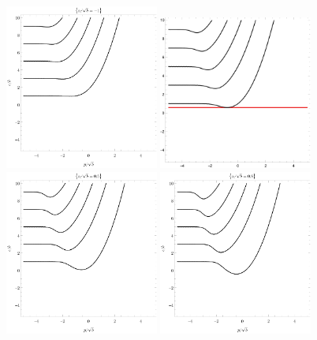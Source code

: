 \begin{figure}[p]
    \centering
    \noindent
    \includegraphics[width=0.45\textwidth]{grafy/robin-1.pdf}%
    \hspace{0.1\textwidth}%
    \includegraphics[width=0.45\textwidth]{grafy/robin0-degennes.pdf}%
    \\[1em]%
    \includegraphics[width=0.45\textwidth]{grafy/robin0.5.pdf}%
    \hspace{0.1\textwidth}%
    \includegraphics[width=0.45\textwidth]{grafy/robin0.8.pdf}%

\end{figure}
